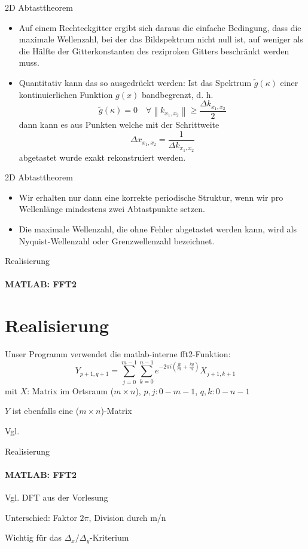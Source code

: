 \documentclass{beamer}
\begin{document}
	\begin{frame}{2D Abtasttheorem}
	\begin{itemize}
		\item Auf einem Rechteckgitter ergibt sich daraus die einfache Bedingung,	dass die maximale Wellenzahl, bei der das Bildspektrum nicht null ist,
		auf weniger als die Hälfte der Gitterkonstanten des reziproken Gitters beschränkt werden muss.
		\item Quantitativ kann das so ausgedrückt werden: Ist das Spektrum $\tilde{g}(\kappa)$ einer kontinuierlichen Funktion $g(x)$ bandbegrenzt, d. h.
		$$\tilde{g}(\kappa) = 0 \hspace{1em} \forall \left\|k_{x_1,x_2}\right\|\ge \frac{\Delta k_{x_1,x_2}}{2} $$
		dann kann es aus Punkten welche mit der Schrittweite
		$$\Delta x_{x_1,x_2} = \frac{1}{\Delta k_{x_1,x_2}} $$
		abgetastet wurde exakt rekonstruiert werden.\cite{bildverarbeitung}
	\end{itemize}
	\end{frame}

	\begin{frame}{2D Abtasttheorem}
	\begin{itemize}
		\item Wir erhalten nur dann eine korrekte periodische
		Struktur, wenn wir pro Wellenlänge mindestens zwei Abtastpunkte setzen.
		\item Die maximale Wellenzahl, die ohne Fehler abgetastet werden kann, wird als	Nyquist-Wellenzahl oder Grenzwellenzahl bezeichnet.
	\end{itemize}
	\end{frame}
	
	\begin{frame}{Realisierung}
	\framesubtitle{MATLAB: FFT2}
	\section{Realisierung}	
	Unser Programm verwendet die matlab-interne fft2-Funktion:
	$$Y_{p+1,q+1} = \sum_{j=0}^{m-1}\sum_{k=0}^{n-1}e^{-2\pi i(\frac{jp}{m}+\frac{kq}{n})}X_{j+1,k+1}$$ mit $X$: Matrix im Ortsraum ($m\times n$), $p,j: 0 - m-1$, $q,k: 0 - n-1$

	$Y$ ist ebenfalls eine ($m\times n$)-Matrix
	
	Vgl. \cite{fft2}
	\end{frame}
	\begin{frame}{Realisierung}
	\framesubtitle{MATLAB: FFT2}
	Vgl. DFT aus der Vorlesung
	
	Unterschied: Faktor $2\pi$, Division durch m/n
	
	Wichtig für das $\Delta_x / \Delta_y$-Kriterium
	\end{frame}
	
\end{document}
